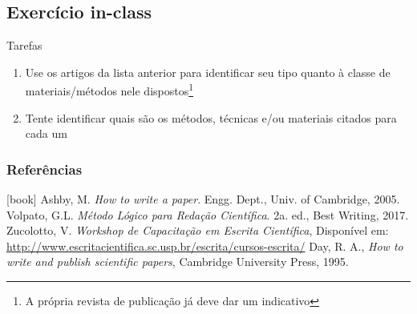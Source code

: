 \subsection{Exercício in-class}

\begin{frame}{Tarefas}
\begin{enumerate}
\item Use os artigos da lista anterior para identificar seu tipo quanto à classe de materiais/métodos nele dispostos\footnote{A própria revista de publicação já deve dar um indicativo}
\item Tente identificar quais são os métodos, técnicas e/ou materiais citados para cada um
\end{enumerate}
\end{frame}

\begin{frame}[allowframebreaks]
\frametitle{Referências}
\begin{thebibliography}{9}
[book]
%
Ashby, M. \textit{How to write a paper}. Engg. Dept., Univ. of Cambridge, 2005.
%
Volpato, G.L. \textit{Método Lógico para Redação Científica}. 2a. ed., Best Writing, 2017.
%
Zucolotto, V. \textit{Workshop de Capacitação em Escrita Científica}, Disponível em: \url{http://www.escritacientifica.sc.usp.br/escrita/cursos-escrita/}
%
 Day, R. A., \textit{How to write and publish scientific papers}, Cambridge University Press, 1995.
\end{thebibliography}
\end{frame}